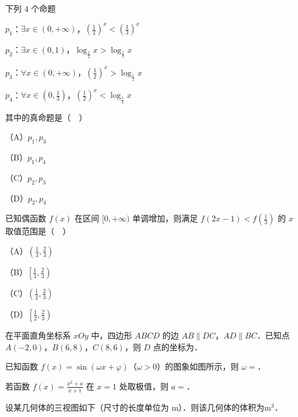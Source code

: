 \begin{question}
下列 $4$ 个命题

$p_1$：$\exists x\in(0,+\infty)$，$\left(\frac12\right)^x<\left(\frac13\right)^x$

$p_2$：$\exists x\in(0,1)$，$\log_{\frac12}x>\log_{\frac13}x$

$p_3$：$\forall x\in(0,+\infty)$，$\left(\frac12\right)^x>\log_{\frac12}x$

$p_4$：$\forall x\in\left(0,\frac13\right)$，$\left(\frac12\right)^x<\log_{\frac13}x$

其中的真命题是（　）

（A）$p_1,p_3$

（B）$p_1,p_4$

（C）$p_2,p_3$

（D）$p_2,p_4$

\end{question}
\begin{question}
已知偶函数 $f(x)$ 在区间 $[0,+\infty)$ 单调增加，则满足 $f(2x-1)<f\left(\frac13\right)$ 的 $x$ 取值范围是（　）

（A）$\left(\frac13,\frac23\right)$

（B）$\left[\frac13,\frac23\right)$

（C）$\left(\frac12,\frac23\right)$

（D）$\left[\frac12,\frac23\right)$

\end{question}

\begin{question}
在平面直角坐标系 $xOy$ 中，四边形 $ABCD$ 的边 $AB\parallel DC$，$AD\parallel BC$．已知点 $A(-2,0)$，$B(6,8)$，$C(8,6)$，则 $D$ 点的坐标为\gkblank{}．

\Needspace{0.4\textheight}
\end{question}
\begin{question}
已知函数 $f(x)=\sin(\omega x+\varphi)$（$\omega>0$）的图象如图所示，则 $\omega=$\gkblank{}．
\nopagebreak[4]
\begin{center}\end{center}
\nopagebreak[4]
\end{question}
\begin{question}
若函数 $f(x)=\frac{x^2+a}{x+1}$ 在 $x=1$ 处取极值，则 $a=$\gkblank{}．

\Needspace{0.4\textheight}
\end{question}
\begin{question}
设某几何体的三视图如下（尺寸的长度单位为 $\mathrm m$）．则该几何体的体积为\gkblank{}$\mathrm m^3$．
\nopagebreak[4]
\begin{center}\end{center}
\nopagebreak[4]
\end{question}

